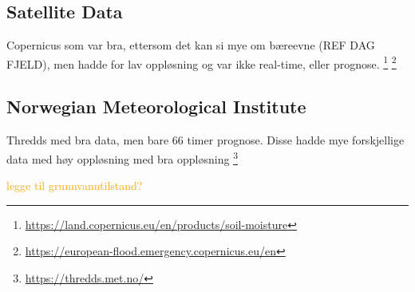 \subsection{Satellite Data}

Copernicus som var bra, ettersom det kan si mye om bæreevne (REF DAG FJELD), men hadde for lav oppløsning og var ikke real-time, eller prognose.
\footnote{\url{https://land.copernicus.eu/en/products/soil-moisture}}
\footnote{\url{https://european-flood.emergency.copernicus.eu/en}}

\subsection{Norwegian Meteorological Institute}

Thredds med bra data, men bare 66 timer prognose. Disse hadde mye forskjellige data med høy oppløsning med bra oppløsning
\footnote{\url{https://thredds.met.no/}}

\textcolor{orange}{legge til grunnvanntilstand?}